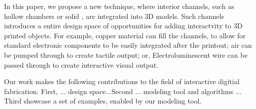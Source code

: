 In this paper, we propose a new technique, where interior channels, such as hollow chambers or solid , are integrated into 3D models. Such channels introduces a entire design space of opportunities for adding interactvity to 3D printed objects. For example, copper material can fill the channels, to allow for standard electronic components to be easily integrated after the printout; air can be pumped through to create tactile output; or, Electroluminescent wire can be passed through to create interactive visual output. 

Our work makes the following contributions to the field of interactive digitial fabrication. First, ... design space...Second ... modeling tool and algorithms ... Third showcase a set of examples, enabled by our modeling tool. 